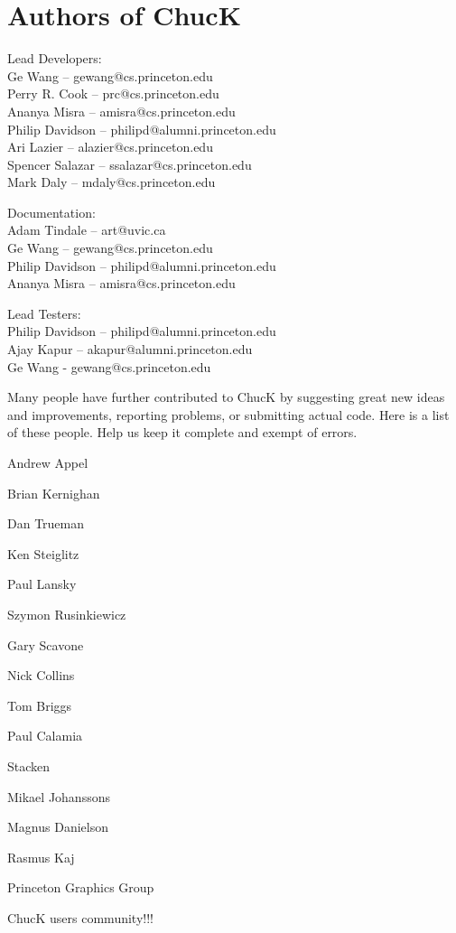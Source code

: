 \newpage
\section{Authors of ChucK}

Lead Developers:\\
\authtab Ge Wang -- gewang@cs.princeton.edu\\
\authtab Perry R. Cook -- prc@cs.princeton.edu\\
\authtab Ananya Misra -- amisra@cs.princeton.edu\\
\authtab Philip Davidson -- philipd@alumni.princeton.edu\\
\authtab Ari Lazier -- alazier@cs.princeton.edu\\
\authtab Spencer Salazar -- ssalazar@cs.princeton.edu\\
\authtab Mark Daly -- mdaly@cs.princeton.edu

Documentation:\\
\authtab Adam Tindale -- art@uvic.ca\\
\authtab Ge Wang -- gewang@cs.princeton.edu\\
\authtab Philip Davidson -- philipd@alumni.princeton.edu\\
\authtab Ananya Misra -- amisra@cs.princeton.edu

Lead Testers:\\
\authtab Philip Davidson -- philipd@alumni.princeton.edu\\
\authtab Ajay Kapur -- akapur@alumni.princeton.edu\\
\authtab Ge Wang - gewang@cs.princeton.edu


Many people have further contributed to ChucK by suggesting great new 
ideas and improvements, reporting problems, or submitting actual code. 
Here is a list of these people.  Help us keep it complete and exempt of 
errors.

\begin{chuckitemize}
\item Andrew Appel 
\item Brian Kernighan 
\item Dan Trueman 
\item Ken Steiglitz 
\item Paul Lansky 
\item Szymon Rusinkiewicz 
\item Gary Scavone 
\item Nick Collins 
\item Tom Briggs 
\item Paul Calamia 
\item Stacken 
  \begin{chuckitemize}
  \item Mikael Johanssons 
  \item Magnus Danielson 
  \item Rasmus Kaj 
  \end{chuckitemize}
\item Princeton Graphics Group
\item ChucK users community!!!
\end{chuckitemize}
